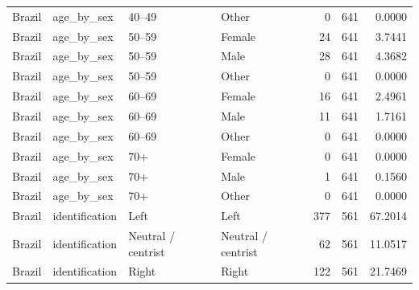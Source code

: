 \begin{tabular}{llllrrr}
Brazil & age_by_sex & 40–49 & Other & 0 & 641 & 0.0000 \\
Brazil & age_by_sex & 50–59 & Female & 24 & 641 & 3.7441 \\
Brazil & age_by_sex & 50–59 & Male & 28 & 641 & 4.3682 \\
Brazil & age_by_sex & 50–59 & Other & 0 & 641 & 0.0000 \\
Brazil & age_by_sex & 60–69 & Female & 16 & 641 & 2.4961 \\
Brazil & age_by_sex & 60–69 & Male & 11 & 641 & 1.7161 \\
Brazil & age_by_sex & 60–69 & Other & 0 & 641 & 0.0000 \\
Brazil & age_by_sex & 70+ & Female & 0 & 641 & 0.0000 \\
Brazil & age_by_sex & 70+ & Male & 1 & 641 & 0.1560 \\
Brazil & age_by_sex & 70+ & Other & 0 & 641 & 0.0000 \\
Brazil & identification & Left & Left & 377 & 561 & 67.2014 \\
Brazil & identification & Neutral / centrist & Neutral / centrist & 62 & 561 & 11.0517 \\
Brazil & identification & Right & Right & 122 & 561 & 21.7469 \\
\bottomrule
\end{tabular}
